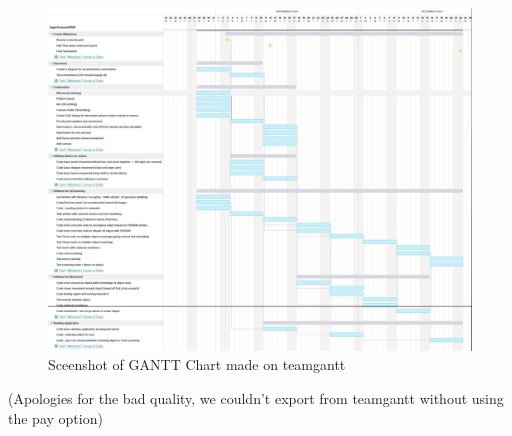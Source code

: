 \documentclass{article}
\begin{document}
\begin{figure}[H]
    \centering
    \includegraphics[width=1\textwidth]{images/gantt_chart.jpg}
    \caption{Sceenshot of GANTT Chart made on teamgantt}
    \label{fig:gantt_chart}
\end{figure}

(Apologies for the bad quality, we couldn't export from teamgantt without using the pay option)

\printbibliography
\end{document}
